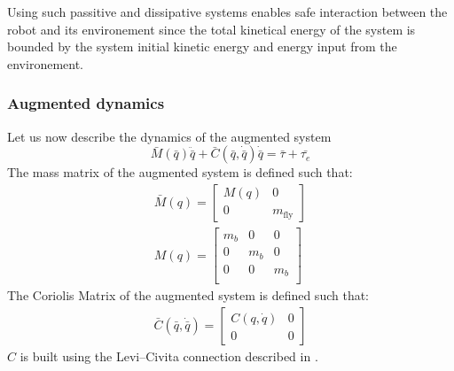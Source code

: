 Using such passitive and dissipative systems enables safe interaction between the robot and its environement since the total kinetical energy of the system is bounded by the system initial kinetic energy and energy input from the environement.

\subsubsection{Augmented dynamics}
Let us now describe the dynamics of the augmented system
\begin{equation} 
    \bar{M}(\bar{q})\ddot{\bar{q}} + \bar{C}(\bar{q}, \dot{\bar{q}})\dot{\bar{q}} = \bar{\tau} + \bar{\tau_{e}}
\end{equation}
The mass matrix of the augmented system is defined such that:
\begin{align}
\bar{M}(q) = \begin{bmatrix} 
   M(q) & 0 \\
    0 & m_{\text{fly}}
\end{bmatrix}\\
M(q) =  \begin{bmatrix} 
    m_b & 0 & 0 \\
    0 & m_b & 0 \\
    0 & 0 & m_b \\
 \end{bmatrix}
\end{align}
The Coriolis Matrix of the augmented system is defined such that: 
\begin{align}
\bar{C}(\bar{q}, \dot{\bar{q}}) = \begin{bmatrix} 
    C(q, \dot{q}) & 0 \\
    0 & 0 
\end{bmatrix}
\end{align}
$C$ is built using the Levi–Civita connection described in \cite{li2001passive}.

